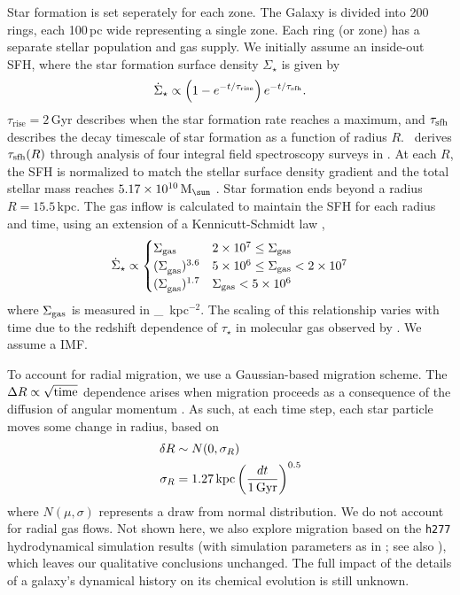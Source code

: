 \documentclass[fleqn,
usenatbib]{mnras}
\newcommand{\JJ}{\citetalias{james+21}}
\newcommand{\imf}{IMF}
\newcommand{\sfh}{SFH} %
\newcommand{\Mo}{%
    \ifmmode {\rm M}_{\sun}%
    \else {M$_{\sun}$}%
    \fi}
\begin{document}
Star formation is set seperately for each zone. The Galaxy is divided into 200 rings, each 100\,pc wide representing a single zone. Each ring (or zone) has a separate stellar population and gas supply. We initially assume an inside-out \sfh{}, where the star formation surface density $\Sigma_\star$ is given by 
\begin{equation}\label{eq:inside_out}
    \dot{\Sigma}_\star \propto \left(1-e^{-t/\tau_{\rm rise}}\right) e^{-t/\tau_{\rm sfh}}.
\end{equation}
$\tau_\text{rise}=2$\,Gyr describes when the star formation rate reaches a maximum, and $\tau_{\rm sfh}$ describes the decay timescale of star formation as a function of radius $R$. \JJ~derives $\tau_{\rm sfh}(R)$ through analysis of four integral field spectroscopy surveys in \cite{sanches20}. At each $R$, the \sfh{} is normalized to match the stellar surface density gradient \citep{BHG16} and the total stellar mass reaches $5.17\times10^{10}\,\Mo$ \citep{LM15}. Star formation ends beyond a radius $R=15.5\,$kpc. 
The gas inflow is calculated to maintain the \sfh{} for each radius and time, using an extension of a Kennicutt-Schmidt law \citep{kennicutt98},
\begin{equation}
\dot{\Sigma}_{\star} \propto 
\begin{cases}
    {\Sigma}_{\rm gas} & 2\times 10^7 \leq \Sigma_{\rm gas} \\ 
    {(\Sigma}_{\rm gas})^{3.6} & 5\times 10^6 \leq \Sigma_{\rm gas} < 2\times10^7 \\ 
    {(\Sigma}_{\rm gas})^{1.7} & \Sigma_{\rm gas} < 5\times10^6 \\ 
\end{cases}
\end{equation} 
where $\Sigma_{\rm gas}$ is measured in \Mo\,kpc$^{-2}$. 
The scaling of this relationship varies with time due to the redshift dependence of $\tau_\star$ in molecular gas observed by \citet{tacconi18}. We assume a \citet{kroupa01} \imf.


To account for radial migration, we use a Gaussian-based migration scheme. The $\Delta R \propto \sqrt{\rm time}$ dependence arises when migration proceeds as a consequence of the diffusion of angular momentum \citep{frankel18, frankel20}.
As such, at each time step, each star particle moves some change in radius, based on 
\begin{subequations}
    \begin{align}
        \delta R &\sim N(0, \sigma_R)\\
        \sigma_R &= 1.27\,{\rm kpc} \left(\frac{dt}{1\,{\rm Gyr}}\right)^{0.5}
    \end{align}
\end{subequations}
where $N(\mu, \sigma)$ represents a draw from normal distribution.
We do not account for radial gas flows.
Not shown here, we also explore migration based on the \texttt{h277} hydrodynamical
simulation results (with simulation parameters as in \citealt{bird+21}; see also \citealt{christensen12, zolotov12, loebman12, BZ14}), which leaves our qualitative conclusions unchanged. 
The full impact of the details of a galaxy's dynamical history on its chemical evolution is still unknown.
\end{document}

